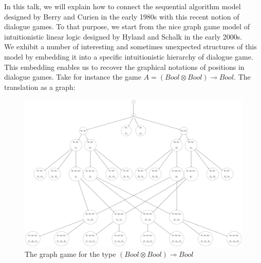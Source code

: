 \documentclass[11pt]{llncs} %
\begin{document}
In this talk, we will explain how to connect the sequential algorithm model designed
by Berry and Curien in the early 1980s with this recent notion of dialogue games.
To that purpose, we start from the nice graph game model of intuitionistic linear logic
designed by Hyland and Schalk in the early 2000s.\\  
We exhibit a number of interesting and sometimes unexpected structures of this model
by embedding it into a specific intuitionistic hierarchy of dialogue game.
This embedding enables us to recover the graphical notations of positions in dialogue games.
Take for instance the game $A=(Bool \otimes Bool) \multimap Bool$.
The translation as a graph:
\begin{figure}[H]\centering\includegraphics[scale=0.46]{bool-tens-bool-arrow-bool-graph.pdf}\caption{The graph game for the type $(Bool \otimes Bool) \multimap Bool$} \end{figure}
\end{document}
